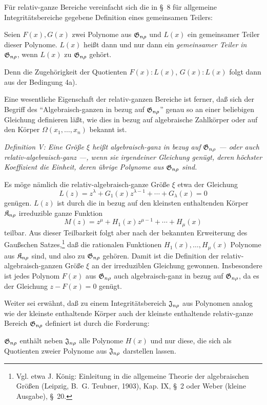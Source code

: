Für relativ-ganze Bereiche vereinfacht sich die in \S\ 8 für allgemeine Integritätsbereiche gegebene Definition eines gemeinsamen Teilers:

Seien $F(x),G(x)$ zwei Polynome aus $\mathfrak{G}_{n\rho}$ und $L(x)$ ein gemeinsamer Teiler dieser Polynome. $L(x)$ heißt dann und nur dann ein \emph{gemeinsamer Teiler in $\mathfrak{G}_{n\rho}$}, wenn $L(x)$ zu $\mathfrak{G}_{n\rho}$ gehört.

Denn die Zugehörigkeit der Quotienten $F(x):L(x)$, $G(x):L(x)$ folgt dann aus der Bedingung 4a).

Eine wesentliche Eigenschaft der relativ-ganzen Bereiche ist ferner, daß sich der Begriff des ``Algebraisch-ganzen in bezug auf $\mathfrak{G}_{n\rho}$'' genau so an einer beliebigen Gleichung definieren läßt, wie dies in bezug auf algebraische Zahlkörper oder auf den Körper $\Omega(x_1,
\ldots,x_n)$ bekannt ist.

\emph{Definition V: Eine Größe $\xi$ heißt algebraisch-ganz in bezug auf $\mathfrak{G}_{n\rho}$ --- oder auch relativ-algebraisch-ganz ---, wenn sie irgendeiner Gleichung genügt, deren höchster Koeffizient die Einheit, deren übrige Polynome aus $\mathfrak{G}_{n\rho}$ sind.}

Es möge nämlich die relativ-algebraisch-ganze Größe $\xi$ etwa der Gleichung
\[
  L(z)=z^\lambda+G_1(x)z^{\lambda-1}+\cdots+G_\lambda(x)=0
\]
genügen. $L(z)$ ist durch die in bezug auf den kleinsten enthaltenden Körper $\mathfrak{K}_{n\rho}$ irreduzible ganze Funktion
\[
  M(z)=z^\mu+H_1(x)z^{\mu-1}+\cdots+H_\mu(x)
\]
teilbar. Aus dieser Teilbarkeit folgt aber nach der bekannten Erweiterung des Gaußschen Satzes,\footnote{Vgl. etwa J. König: Einleitung in die allgemeine Theorie der algebraischen Größen (Leipzig, B.~G. Teubner, 1903), Kap. IX, \S\ 2 oder Weber (kleine Ausgabe), \S\ 20.} daß die rationalen Funktionen $H_1(x),\ldots,H_\mu(x)$ Polynome aus $\mathfrak{K}_{n\rho}$ sind, und also zu $\mathfrak{G}_{n\rho}$ gehören. Damit ist die Definition der relativ-algebraisch-ganzen Größe $\xi$ an der irreduziblen Gleichung gewonnen. Insbesondere ist jedes Polynom $F(x)$ aus $\mathfrak{G}_{n\rho}$ auch algebraisch-ganz in bezug auf $\mathfrak{G}_{n\rho}$, da es der Gleichung $z-F(x)=0$ genügt.

Weiter sei erwähnt, daß zu einem Integritätsbereich $\mathfrak{J}_{n\rho}$ aus Polynomen analog wie der kleinste enthaltende Körper auch der kleinste enthaltende relativ-ganze Bereich $\mathfrak{G}_{n\rho}$ definiert ist durch die Forderung:

$\mathfrak{G}_{n\rho}$ enthält neben $\mathfrak{J}_{n\rho}$ alle Polynome $H(x)$ und nur diese, die sich als Quotienten zweier Polynome aus $\mathfrak{J}_{n\rho}$ darstellen lassen.

